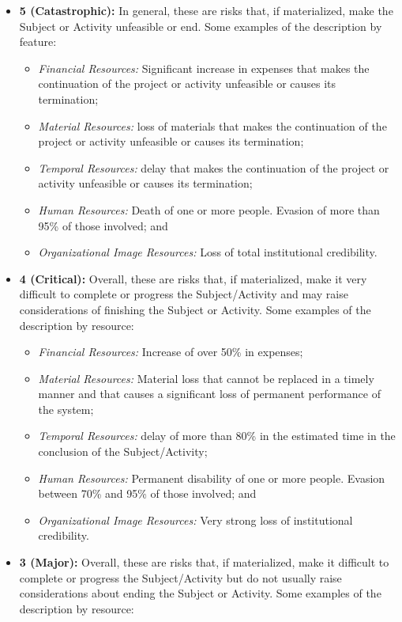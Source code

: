 \begin{itemize}
    \item \textbf{5 (Catastrophic):} In general, these are risks that, if materialized, make the Subject or Activity unfeasible or end. Some examples of the description by feature:
        \begin{itemize}
           \item  \textit{Financial Resources:} Significant increase in expenses that makes the continuation of the project or activity unfeasible or causes its termination;
           \item  \textit{Material Resources:} loss of materials that makes the continuation of the project or activity unfeasible or causes its termination;
           \item  \textit{Temporal Resources:} delay that makes the continuation of the project or activity unfeasible or causes its termination;
           \item  \textit{Human Resources:} Death of one or more people. Evasion of more than 95\% of those involved; and 
           \item  \textit{Organizational Image Resources:} Loss of total institutional credibility.
        \end{itemize}
    \item \textbf{4 (Critical):} Overall, these are risks that, if materialized, make it very difficult to complete or progress the Subject/Activity and may raise considerations of finishing the Subject or Activity. Some examples of the description by resource:
    \begin{itemize}
       \item \textit{ Financial Resources:} Increase of over 50\% in expenses;
       \item  \textit{Material Resources:} Material loss that cannot be replaced in a timely manner and that causes a significant loss of permanent performance of the system;
       \item  \textit{Temporal Resources:} delay of more than 80\% in the estimated time in the conclusion of the Subject/Activity;
       \item  \textit{Human Resources: }Permanent disability of one or more people. Evasion between 70\% and 95\% of those involved; and
       \item  \textit{Organizational Image Resources:} Very strong loss of institutional credibility.
    \end{itemize}
    \item \textbf{3 (Major):} Overall, these are risks that, if materialized, make it difficult to complete or progress the Subject/Activity but do not usually raise considerations about ending the Subject or Activity. Some examples of the description by resource:

\end{itemize}
